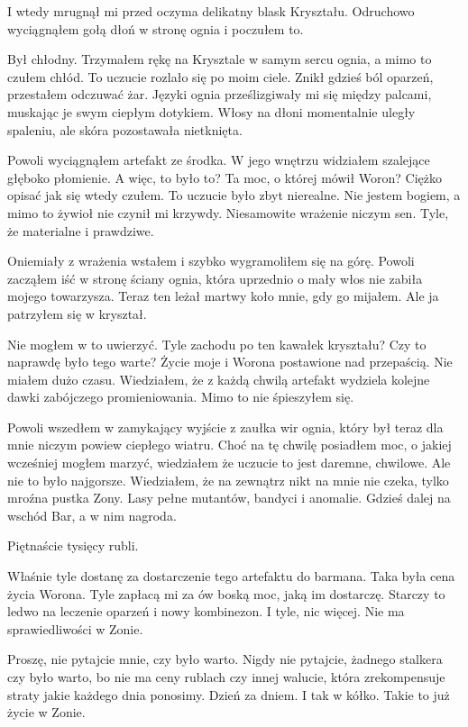\documentclass[../MAIN.tex]{subfiles}
\begin{document}
 I wtedy mrugnął mi przed oczyma delikatny blask Kryształu. Odruchowo wyciągnąłem gołą dłoń w stronę ognia i poczułem to.

 Był chłodny. Trzymałem rękę na Krysztale w samym sercu ognia, a mimo to czułem chłód. To uczucie rozlało się po moim ciele. Znikł gdzieś ból oparzeń, przestałem odczuwać żar. Języki ognia prześlizgiwały mi się między palcami, muskając je swym ciepłym dotykiem. Włosy na dłoni momentalnie uległy spaleniu, ale skóra pozostawała nietknięta.

 Powoli wyciągnąłem artefakt ze środka. W jego wnętrzu widziałem szalejące głęboko płomienie. A więc, to było to? Ta moc, o której mówił Woron? Ciężko opisać jak się wtedy czułem. To uczucie było zbyt nierealne. Nie jestem bogiem, a mimo to żywioł nie czynił mi krzywdy. Niesamowite wrażenie niczym sen. Tyle, że materialne i prawdziwe.

 Oniemiały z wrażenia wstałem i szybko wygramoliłem się na górę. Powoli zacząłem iść w stronę ściany ognia, która uprzednio o mały włos nie zabiła mojego towarzysza. Teraz ten leżał martwy koło mnie, gdy go mijałem. Ale ja patrzyłem się w kryształ.

 Nie mogłem w to uwierzyć. Tyle zachodu po ten kawałek kryształu? Czy to naprawdę było tego warte? Życie moje i Worona postawione nad przepaścią. Nie miałem dużo czasu. Wiedziałem, że z każdą chwilą artefakt wydziela kolejne dawki zabójczego promieniowania. Mimo to nie śpieszyłem się.

 Powoli wszedłem w zamykający wyjście z zaułka wir ognia, który był teraz dla mnie niczym powiew ciepłego wiatru. Choć na tę chwilę posiadłem moc, o jakiej wcześniej mogłem marzyć, wiedziałem że uczucie to jest daremne, chwilowe. Ale nie to było najgorsze. Wiedziałem, że na zewnątrz nikt na mnie nie czeka, tylko mroźna pustka Zony. Lasy pełne mutantów, bandyci i anomalie. Gdzieś dalej na wschód Bar, a w nim nagroda.

 Piętnaście tysięcy rubli.

 Właśnie tyle dostanę za dostarczenie tego artefaktu do barmana. Taka była cena życia Worona. Tyle zapłacą mi za ów boską moc, jaką im dostarczę. Starczy to ledwo na leczenie oparzeń i nowy kombinezon. I tyle, nic więcej. Nie ma sprawiedliwości w Zonie.

 Proszę, nie pytajcie mnie, czy było warto. Nigdy nie pytajcie, żadnego stalkera czy było warto, bo nie ma ceny rublach czy innej walucie, która zrekompensuje straty jakie każdego dnia ponosimy. Dzień za dniem. I tak w kółko.
\center
 Takie to już życie w Zonie.
\end{document}
